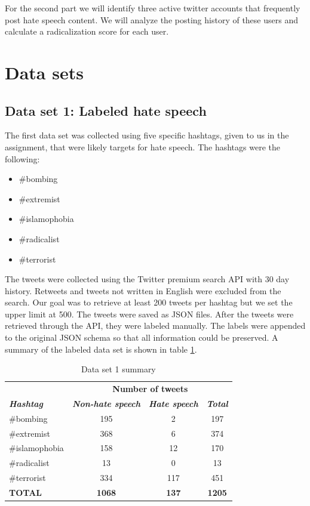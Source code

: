 \documentclass[conference]{IEEEtran}
\begin{document}
For the second part we will identify three active twitter accounts that frequently post 
hate speech content. We will analyze the posting history of these users and calculate a 
radicalization score for each user. 

\section{Data sets}
\subsection{Data set 1: Labeled hate speech}
The first data set was collected using five specific hashtags, given to us in the assignment,
that were likely targets for hate speech. The hashtags were the following: 
\begin{itemize}
    \item \#bombing
    \item \#extremist
    \item \#islamophobia
    \item \#radicalist
    \item \#terrorist    
\end{itemize}

The tweets were collected using the Twitter premium search API with 30 day history. Retweets 
and tweets not written in English were excluded from the search. Our goal was to retrieve at least 
200 tweets per hashtag but we set the upper limit at 500. The tweets were saved as JSON files. 
After the tweets were retrieved through the API, they were labeled manually. The labels were appended  
to the original JSON schema so that all information could be preserved. 
A summary of the labeled data set is shown in table 
\ref{tab:data_set_1_summary}.

\begin{table}[!ht]
    \def\arraystretch{1.2}%
    \begin{center}
      \caption{Data set 1 summary}
      \label{tab:data_set_1_summary}
      \begin{tabular}{l c c c}
        \hline
        &\multicolumn{3}{c}{\textbf{Number of tweets}} \\
        \textbf{\textit{Hashtag}}& \textbf{\textit{Non-hate speech}}& \textbf{\textit{Hate speech}} & \textbf{\textit{Total}}  \\
        \cline{2-4} 
        \hline
        \#bombing & 195 & 2 & 197\\
        \#extremist & 368 & 6 & 374\\
        \#islamophobia & 158 & 12 & 170\\
        \#radicalist & 13 & 0 & 13\\
        \#terrorist & 334 & 117 & 451\\
        \hline
        \textbf{TOTAL} & \textbf{1068} & \textbf{137} & \textbf{1205}\\
        \hline
      \end{tabular}  
    \end{center}
  \end{table}
\end{document}
